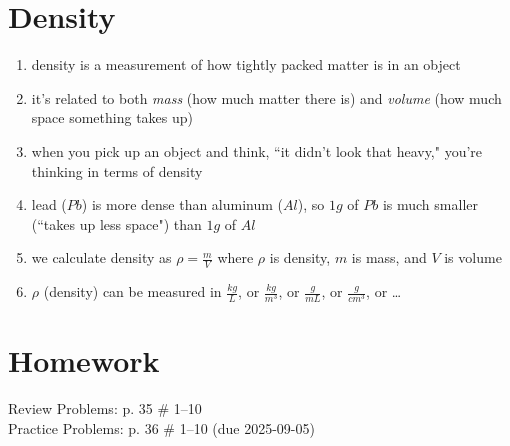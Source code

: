 \documentclass[11pt, oneside]{article}   	%
\begin{document}
\begin{enumerate}[label=Example \arabic*]
\end{enumerate}

\section{Density}
\begin{enumerate}
\item density is a measurement of how tightly packed matter is in an object
\item it's related to both \emph{mass} (how much matter there is) and \emph{volume} (how much space something takes up)
\item when you pick up an object and think, ``it didn't look that heavy," you're thinking in terms of density
\item lead ($Pb$) is more dense than aluminum ($Al$), so $1 g$ of $Pb$ is much smaller (``takes up less space") than $1 g$ of $Al$
\item we calculate density as $ \rho = \frac{m}{V} $ where $\rho$ is density, $m$ is mass, and $V$ is volume
\item $ \rho $ (density) can be measured in $\frac{kg}{L}$, or $\frac{kg}{m^{3}}$, or $\frac{g}{mL}$, or $\frac{g}{cm^{3}}$, or \ldots
\end{enumerate}

\section{Homework}
Review Problems: p. 35 \# 1--10\\
Practice Problems: p. 36 \# 1--10 (due 2025-09-05)\\



{}

\end{document}
